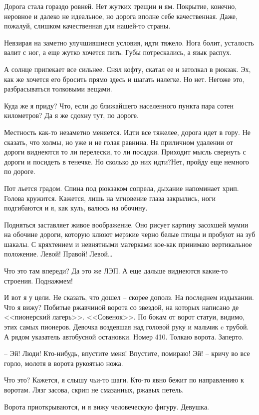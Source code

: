 \documentclass[a4paper]{book}
\begin{document}
Дорога стала гораздо ровней. Нет жутких трещин и ям. Покрытие, конечно, неровное и далеко не идеальное, но дорога вполне себе качественная. Даже, пожалуй, слишком качественная для нашей-то страны. 

Невзирая на заметно улучшившиеся условия, идти тяжело. Нога болит, усталость валит с ног, а еще жутко хочется пить. Губы потрескались, а язык распух. 

А солнце припекает все сильнее. Снял кофту, скатал ее и затолкал в рюкзак. Эх, как же хочется его бросить прямо здесь и шагать налегке. Но нет. Негоже это, разбрасываться толковыми вещами. 

Куда же я приду? Что, если до ближайшего населенного пункта пара сотен километров? Да я же сдохну тут, по дороге. 

Местность как-то незаметно меняется. Идти все тяжелее, дорога идет в гору. Не сказать, что холмы, но уже и не голая равнина. На приличном удалении от дороги виднеются то ли перелески, то ли посадки. Приходит мысль свернуть с дороги и посидеть в тенечке. Но сколько до них идти?Нет, пройду еще немного по дороге. 

Пот льется градом. Спина под рюкзаком сопрела, дыхание напоминает хрип. Голова кружится. Кажется, лишь на мгновение глаза закрылись, ноги подгибаются и я, как куль, валюсь на обочину. 

Подняться заставляет живое воображение. Оно рисует картину засохшей мумии на обочине дороги, которую клюют мерзкие черно белые птицы и пробуют на зуб шакалы. С кряхтением и невнятными матерками кое-как принимаю вертикальное положение. Левой! Правой! Левой\ldots

Что это там впереди? Да это же ЛЭП. А еще дальше виднеются какие-то строения. Поднажмем!

И вот я у цели. Не сказать, что дошел -- скорее дополз. На последнем издыхании. Что я вижу? Побитые ржавчиной ворота со звездой, на которых написано де <<пионерский лагерь>>. <<Совенок>>. По бокам от ворот статуи, видимо, этих самых пионеров. Девочка воздевшая над головой руку и мальчик c трубой. А рядом указатель автобусной остановки. Номер 410. Толкаю ворота. Заперто.

-- Эй! Люди! Кто-нибудь, впустите меня! Впустите, помираю! Эй! -- кричу во все горло, молотя в ворота рукоятью ножа. 

Что это? Кажется, я слышу чьи-то шаги. Кто-то явно бежит по направлению к воротам. Лязг засова, скрип не смазанных, ржавых петель. 

Ворота приоткрываются, и я вижу человеческую фигуру. Девушка. 
\end{document}
